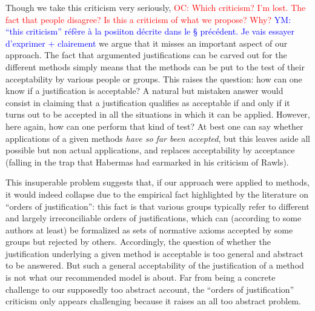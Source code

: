 \documentclass[preprint, french, english, 11pt]{elsarticle}%
\newcommand{\commentYM}[1]{\textcolor{blue}{YM: #1}}
\newcommand{\commentOC}[1]{\textcolor{red}{OC: #1}}
\begin{document}
Though we take this criticism very seriously, 
\commentOC{Which criticism? I’m lost. The fact that people disagree? Is this a criticism of what we propose? Why?} \commentYM{``this criticism'' réfère à la posiiton décrite dans le § précédent. Je vais essayer d'exprimer + clairement}
we argue that it misses an important aspect of our approach. The fact that argumented justifications can be carved out for the different methods simply means that the methods can be put to the test of their acceptability by various people or groups. This raises the question: how can one know if a justification is acceptable? A natural but mistaken answer would consist in claiming that a justification qualifies as acceptable if and only if it turns out to be accepted in all the situations in which it can be applied. However, here again, how can one perform that kind of test? At best one can say whether applications of a given methods \emph{have so far been accepted}, but this leaves aside all possible but non actual applications, and replaces acceptability by acceptance (falling in the trap that Habermas had earmarked in his criticism of Rawls).

This insuperable problem suggests that, if our approach were applied to methods, it would indeed collapse due to the empirical fact highlighted by the literature on ``orders of justification'': this fact is that various groups typically refer to different and largely irreconciliable orders of justifications, which can (according to some authors at least) be formalized as sets of normative axioms accepted by some groups but rejected by others. Accordingly, the question of whether the justification underlying a given method is acceptable is too general and abstract to be answered. But such a general acceptability of the justification of a method is not what our recommended model is about. Far from being a concrete challenge to our supposedly too abstract account, the ``orders of justification'' criticism only appears challenging because it raises an all too abstract problem. 
\end{document}
